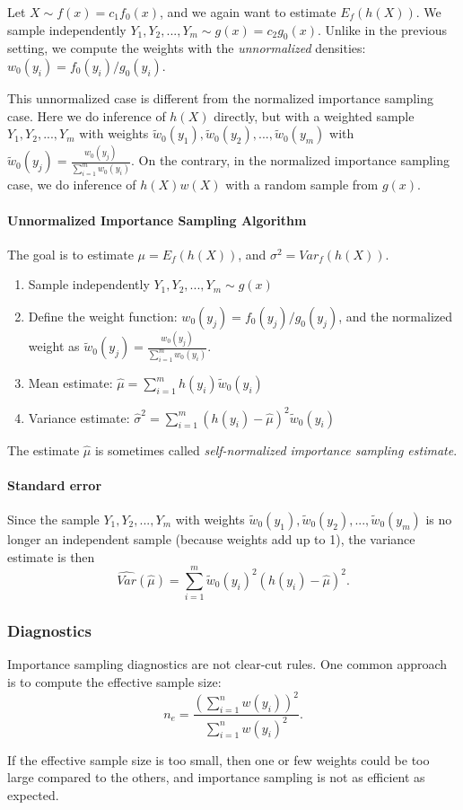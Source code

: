 \documentclass[useAMS,usenatbib]{biom}
\begin{document}
Let $X \sim f(x) = c_1 f_0(x)$, and we again want to estimate
$E_f(h(X))$. We sample independently $Y_1,Y_2,...,Y_m \sim g(x) = c_2
g_0(x)$.
Unlike in the previous setting, we compute the weights with the
\textit{unnormalized} densities: $w_0(y_i) = f_0(y_i) / g_0(y_i)$.

This unnormalized case is different from the normalized importance
sampling case. Here we do inference of $h(X)$ directly, but
with a weighted sample $Y_1,Y_2,...,Y_m$ with weights
$\tilde{w}_0(y_1),\tilde{w}_0(y_2),...,\tilde{w}_0(y_m)$ with
$\tilde{w}_0(y_j) = \frac{w_0(y_j)}{\sum_{i=1}^m w_0(y_i)}.$ On the
contrary, in the normalized importance sampling case, we do inference
of $h(X)w(X)$ with a random sample from $g(x)$.

\paragraph{Unnormalized Importance Sampling Algorithm} The goal is to estimate
$\mu = E_f(h(X))$, and $\sigma^2 = Var_f(h(X))$.
\begin{enumerate}
\item{Sample independently $Y_1,Y_2,...,Y_m \sim g(x)$}
\item{Define the weight function: $w_0(y_j) = f_0(y_j)/g_0(y_j)$, and
    the normalized weight as $\tilde{w}_0(y_j) =
    \frac{w_0(y_j)}{\sum_{i=1}^m w_0(y_i)}.$}
\item{Mean estimate: $\hat{\mu} = \sum_{i=1}^m
    h(y_i)\tilde{w}_0(y_i)$}
\item{Variance estimate: $\hat{\sigma}^2 = \sum_{i=1}^m
    (h(y_i) - \hat{\mu})^2 \tilde{w}_0(y_i)$}
\end{enumerate}

The estimate $\hat{\mu}$ is sometimes called
\textit{self-normalized importance sampling estimate}.

\paragraph{Standard error}
Since the sample $Y_1,Y_2,...,Y_m$ with weights
$\tilde{w}_0(y_1),\tilde{w}_0(y_2),...,\tilde{w}_0(y_m)$ is no longer
an independent sample (because weights add up to 1), the variance
estimate is then \citep{Owen2013}
\begin{equation}
\widehat{Var}(\hat{\mu}) = \sum_{i=1}^m \tilde{w}_0(y_i)^2(h(y_i)-\hat{\mu})^2.
\end{equation}

\subsubsection{Diagnostics}
Importance sampling diagnostics are not clear-cut rules. One common
approach is to compute the effective sample size:
\begin{equation}
n_e = \frac{\left( \sum_{i=1}^n w(y_i) \right)^2}{\sum_{i=1}^nw(y_i)^2}.
\end{equation}

If the effective sample size is too small, then one or few weights
could be too large compared to the others, and importance sampling is
not as efficient as expected.


\label{lastpage}
\end{document}

